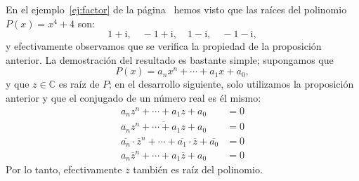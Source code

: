 En el ejemplo~\ref{ej:factor} de la página~\pageref{ej:factor} hemos visto que las raíces del polinomio $P(x)=x^4+4$ son:
\[
1+\mathrm{i},\quad
-1+\mathrm{i},\quad
1-\mathrm{i},\quad
-1-\mathrm{i},
\]
y efectivamente observamos que se verifica la propiedad de la proposición anterior.
La demostración del resultado es bastante simple; supongamos que
\[
P(x)=a_nx^n+\cdots+a_1x+a_0,
\]
y que $z\in\mathbb{C}$ es raíz de $P$; en el desarrollo siguiente, solo utilizamos la proposición anterior y que el conjugado de un número real es él mismo:
%
\begin{align*}
a_nz^n+\cdots+a_1z+a_0 & = 0 \\
\overline{a_nz^n+\cdots+a_1z+a_0} & = 0 \\
\overline{a_n}\cdot\overline{z}^n+\cdots+\overline{a_1}\cdot\overline{z}+\overline{a_0} & = 0 \\
{a_n}\overline{z}^n+\cdots+{a_1}\overline{z}+a_0 & = 0
\end{align*}
Por lo tanto, efectivamente $\overline z$ también es raíz del polinomio.
%
